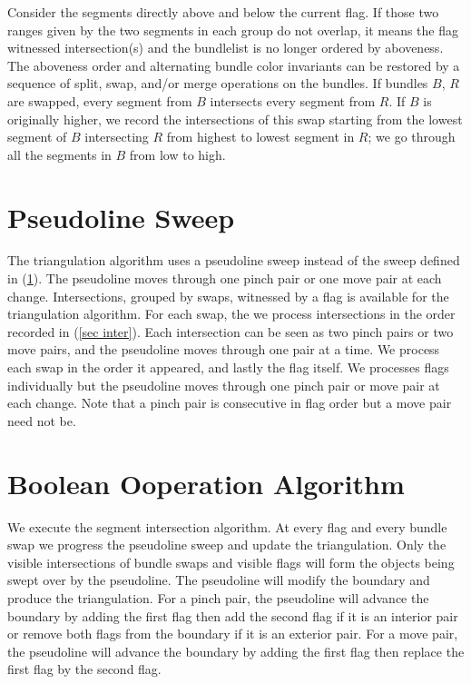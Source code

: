 \documentclass[11pt]{article}
\begin{document}
Consider the segments directly above and below the current flag. 
If those two ranges given by the two segments in each group do not overlap, it means the flag witnessed intersection(s) and the bundlelist is no longer ordered by aboveness.
The aboveness order and alternating bundle color invariants can be restored by a sequence of split, swap, and/or merge operations on the bundles.
If bundles $B$, $R$ are swapped, every segment from $B$ intersects every segment from $R$.
If $B$ is originally higher, we record the intersections of this swap starting from the lowest segment of $B$ intersecting $R$ from highest to lowest segment in $R$; we go through all the segments in $B$ from low to high.

\section{Pseudoline Sweep} \label{sec sweep}
The triangulation algorithm uses a pseudoline sweep instead of the sweep defined in (\ref{sec sweep}).
The pseudoline moves through one pinch pair or one move pair at each change.
Intersections, grouped by swaps, witnessed by a flag is available for the triangulation algorithm.
For each swap, the we process intersections in the order recorded in (\ref{sec inter}).
Each intersection can be seen as two pinch pairs or two move pairs, and the pseudoline moves through one pair at a time.
We process each swap in the order it appeared, and lastly the flag itself.
We processes flags individually but the pseudoline moves through one pinch pair or move pair at each change.
Note that a pinch pair is consecutive in flag order but a move pair need not be.

\section{Boolean Ooperation Algorithm}
We execute the segment intersection algorithm.
At every flag and every bundle swap we progress the pseudoline sweep and update the triangulation.
Only the visible intersections of bundle swaps and visible flags will form the objects being swept over by the pseudoline.
The pseudoline will modify the boundary and produce the triangulation.
For a pinch pair, the pseudoline will advance the boundary by adding the first flag then add the second flag if it is an interior pair or remove both flags from the boundary if it is an exterior pair.
For a move pair, the pseudoline will advance the boundary by adding the first flag then replace the first flag by the second flag.
\end{document}
